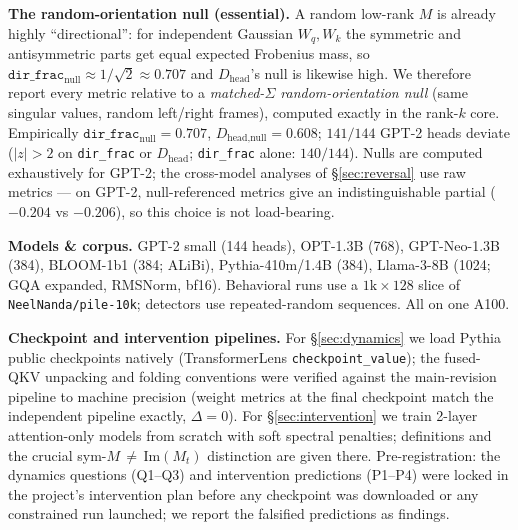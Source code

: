 \documentclass[11pt]{article}
\newcommand{\dirfrac}{\texttt{dir\_frac}\xspace}
\newcommand{\Dhead}{\ensuremath{D_{\text{head}}}\xspace}
\newcommand{\M}{\ensuremath{M}\xspace}
\newcommand{\Mt}{\ensuremath{M_t}\xspace}
\newcommand{\Wq}{\ensuremath{W_q}}
\newcommand{\Wk}{\ensuremath{W_k}}
\begin{document}
\textbf{The random-orientation null (essential).} A random low-rank \M is already highly ``directional'': for
independent Gaussian $\Wq,\Wk$ the symmetric and antisymmetric parts get equal expected Frobenius mass, so
$\dirfrac_{\text{null}}\approx 1/\sqrt2\approx0.707$ and \Dhead's null is likewise high. We therefore report every
metric relative to a \emph{matched-$\Sigma$ random-orientation null} (same singular values, random left/right frames),
computed exactly in the rank-$k$ core. Empirically $\dirfrac_{\text{null}}{=}0.707$, $D_{\text{head,null}}{=}0.608$;
$141/144$ GPT-2 heads deviate ($|z|{>}2$ on \dirfrac or \Dhead; \dirfrac alone: $140/144$). Nulls are computed
exhaustively for GPT-2; the cross-model analyses of \S\ref{sec:reversal} use raw metrics --- on GPT-2,
null-referenced metrics give an indistinguishable partial ($-0.204$ vs $-0.206$), so this choice is not load-bearing.

\textbf{Models \& corpus.} GPT-2 small (144 heads), OPT-1.3B (768), GPT-Neo-1.3B (384), BLOOM-1b1 (384; ALiBi),
Pythia-410m/1.4B (384), Llama-3-8B (1024; GQA expanded, RMSNorm, bf16). Behavioral runs use a $1\mathrm{k}\times128$ slice of \texttt{NeelNanda/pile-10k}; detectors use repeated-random
sequences. All on one A100.

\textbf{Checkpoint and intervention pipelines.} For \S\ref{sec:dynamics} we load Pythia public checkpoints natively
(TransformerLens \texttt{checkpoint\_value}); the fused-QKV unpacking and folding conventions were verified against
the main-revision pipeline to machine precision (weight metrics at the final checkpoint match the independent
pipeline exactly, $\Delta{=}0$). For \S\ref{sec:intervention} we train 2-layer attention-only models from scratch
with soft spectral penalties; definitions and the crucial sym-\M\,$\neq$\,$\mathrm{Im}(\Mt)$ distinction are given
there. Pre-registration: the dynamics questions (Q1--Q3) and intervention predictions (P1--P4) were locked in the
project's intervention plan before any checkpoint was downloaded or any constrained run launched; we report the
falsified predictions as findings.
\end{document}

